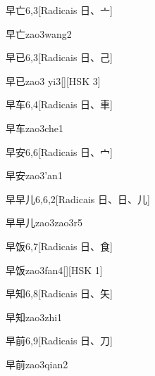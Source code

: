 \begin{entry}{早亡}{6,3}[Radicais ⽇、⼇]
  \begin{phonetics}{早亡}{zao3wang2}
  \end{phonetics}
\end{entry}

\begin{entry}{早已}{6,3}[Radicais ⽇、⼰]
  \begin{phonetics}{早已}{zao3 yi3}[][HSK 3]
  \end{phonetics}
\end{entry}

\begin{entry}{早车}{6,4}[Radicais ⽇、⾞]
  \begin{phonetics}{早车}{zao3che1}
  \end{phonetics}
\end{entry}

\begin{entry}{早安}{6,6}[Radicais ⽇、⼧]
  \begin{phonetics}{早安}{zao3'an1}
  \end{phonetics}
\end{entry}

\begin{entry}{早早儿}{6,6,2}[Radicais ⽇、⽇、⼉]
  \begin{phonetics}{早早儿}{zao3zao3r5}
  \end{phonetics}
\end{entry}

\begin{entry}{早饭}{6,7}[Radicais ⽇、⾷]
  \begin{phonetics}{早饭}{zao3fan4}[][HSK 1]
  \end{phonetics}
\end{entry}

\begin{entry}{早知}{6,8}[Radicais ⽇、⽮]
  \begin{phonetics}{早知}{zao3zhi1}
  \end{phonetics}
\end{entry}

\begin{entry}{早前}{6,9}[Radicais ⽇、⼑]
  \begin{phonetics}{早前}{zao3qian2}
  \end{phonetics}
\end{entry}


